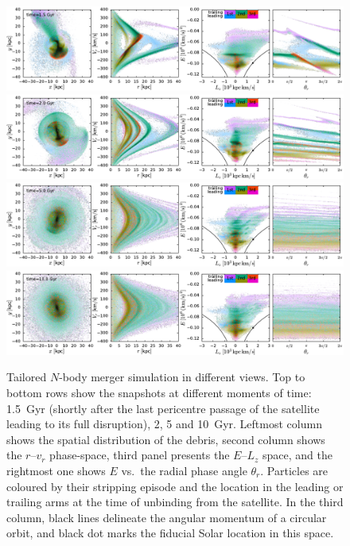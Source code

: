 \documentclass[a4paper,useAMS,usenatbib]{mnras}
\begin{document}
%
\begin{figure}
  \centering
  \includegraphics{img/mergersim_global0.pdf}
  \includegraphics{img/mergersim_global1.pdf}
  \includegraphics{img/mergersim_global2.pdf}
  \includegraphics{img/mergersim_global3.pdf}
  \caption{
  Tailored $N$-body merger simulation in different views. Top to bottom rows show the snapshots at different moments of time: 1.5~Gyr (shortly after the last pericentre passage of the satellite leading to its full disruption), 2, 5 and 10~Gyr. Leftmost column shows the spatial distribution of the debris, second column shows the $r$--$v_r$ phase-space, third panel presents the $E$--$L_z$ space, and the rightmost one shows $E$ vs.\ the radial phase angle $\theta_r$. Particles are coloured by their stripping episode and the location in the leading or trailing arms at the time of unbinding from the satellite. In the third column, black lines delineate the angular momentum of a circular orbit, and black dot marks the fiducial Solar location in this space.
  }
  \label{fig:mergersim_global}
\end{figure}
%
\end{document}
